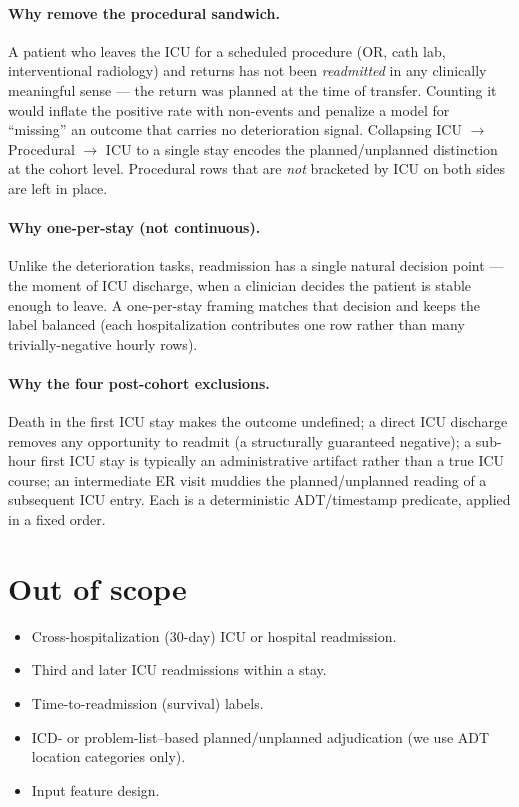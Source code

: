 \documentclass[11pt]{article}
\begin{document}
\paragraph{Why remove the procedural sandwich.}
A patient who leaves the ICU for a scheduled procedure (OR, cath lab,
interventional radiology) and returns has not been \emph{readmitted} in any
clinically meaningful sense --- the return was planned at the time of
transfer. Counting it would inflate the positive rate with non-events and
penalize a model for ``missing'' an outcome that carries no deterioration
signal. Collapsing ICU $\to$ Procedural $\to$ ICU to a single stay encodes
the planned/unplanned distinction at the cohort level. Procedural rows that
are \emph{not} bracketed by ICU on both sides are left in place.

\paragraph{Why one-per-stay (not continuous).}
Unlike the deterioration tasks, readmission has a single natural decision
point --- the moment of ICU discharge, when a clinician decides the patient
is stable enough to leave. A one-per-stay framing matches that decision and
keeps the label balanced (each hospitalization contributes one row rather
than many trivially-negative hourly rows).

\paragraph{Why the four post-cohort exclusions.}
Death in the first ICU stay makes the outcome undefined; a direct ICU
discharge removes any opportunity to readmit (a structurally guaranteed
negative); a sub-hour first ICU stay is typically an administrative
artifact rather than a true ICU course; an intermediate ER visit muddies
the planned/unplanned reading of a subsequent ICU entry. Each is a
deterministic ADT/timestamp predicate, applied in a fixed order.

\section{Out of scope}

\begin{itemize}[leftmargin=2em]
  \item Cross-hospitalization (30-day) ICU or hospital readmission.
  \item Third and later ICU readmissions within a stay.
  \item Time-to-readmission (survival) labels.
  \item ICD- or problem-list--based planned/unplanned adjudication
        (we use ADT location categories only).
  \item Input feature design.
\end{itemize}



\end{document}
